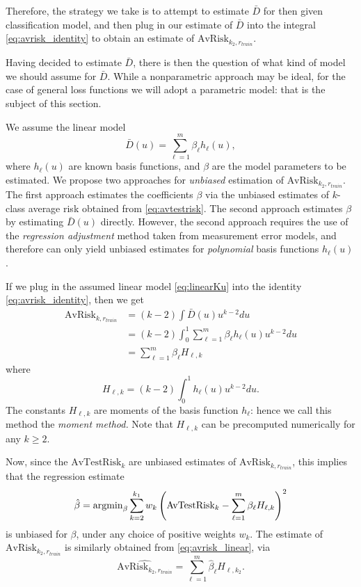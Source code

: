 \documentclass[12pt]{article}
\begin{document}
Therefore, the strategy we take is to attempt to estimate $\bar{D}$
for then given classification model, and then plug in our estimate of
$\bar{D}$ into the integral \eqref{eq:avrisk_identity} to obtain an
estimate of $\text{AvRisk}_{k_2, r_{train}}$.

Having decided to estimate $\bar{D}$, there is then the question of
what kind of model we should assume for $\bar{D}$.  While a
nonparametric approach may be ideal, for the case of general loss
functions we will adopt a parametric model: that is the subject of
this section.

We assume the linear model
\begin{equation}\label{eq:linearKu}
\bar{D}(u) = \sum_{\ell = 1}^m \beta_\ell h_\ell(u),
\end{equation}
where $h_\ell(u)$ are known basis functions, and $\beta$ are the model
parameters to be estimated. We propose two approaches
for \emph{unbiased} estimation of $\text{AvRisk}_{k_2, r_{train}}$.
The first approach estimates the coefficients $\beta$ via the unbiased
estimates of $k$-class average risk obtained
from \eqref{eq:avtestrisk}.  The second approach estimates $\beta$ by
estimating $\bar{D}(u)$ directly.  However, the second approach
requires the use of the \emph{regression adjustment} method taken from
measurement error models, and therefore can only yield unbiased
estimates for \emph{polynomial} basis functions $h_\ell(u)$.

If we plug in the assumed linear model \eqref{eq:linearKu} into the
identity \eqref{eq:avrisk_identity}, then we get
\begin{align}
\text{AvRisk}_{k, r_{train}} &= (k-2)\int \bar{D}(u) u^{k-2} du
\\&= (k-2)\int_0^1 \sum_{\ell = 1}^m \beta_\ell h_\ell(u) u^{k-2} du
\\&= \sum_{\ell = 1}^m \beta_\ell H_{\ell,k} \label{eq:avrisk_linear}
\end{align}
where
\begin{equation}
H_{\ell,k} = (k-2) \int_0^1 h_\ell(u) u^{k-2} du.
\end{equation}
The constants $H_{\ell, k}$ are moments of the basis function
$h_\ell$: hence we call this method the \emph{moment method.}  Note
that $H_{\ell, k}$ can be precomputed numerically for any $k \geq 2$.


Now, since the $\text{AvTestRisk}_k$ are unbiased estimates of
$\text{AvRisk}_{k, r_{train}}$, this implies that the regression
estimate
\[
\hat{\beta} = \text{argmin}_\beta \sum_{k=2}^{k_1} w_k \left(\text{AvTestRisk}_k - \sum_{\ell=1}^m \beta_\ell H_{\ell, k}\right)^2
\]
is unbiased for $\beta$, under any choice of positive weights $w_k$.
The estimate of $\text{AvRisk}_{k_2,r_{train}}$ is similarly obtained
from \eqref{eq:avrisk_linear}, via
\begin{equation}\label{eq:avrisk_hat}
\widehat{\text{AvRisk}_{k_2,r_{train}}} = \sum_{\ell=1}^m \hat{\beta}_\ell H_{\ell, k_2}.
\end{equation}
\end{document}
